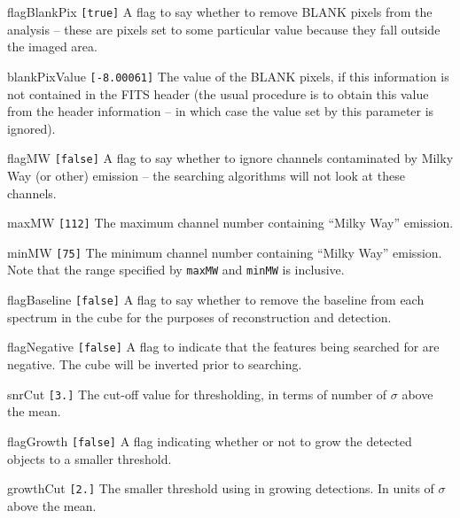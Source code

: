 \begin{entry}
\item[flagBlankPix \texttt{[true]}] A flag to say whether to remove
  BLANK pixels from the analysis -- these are pixels set to some
  particular value because they fall outside the imaged area.
\item[blankPixValue \texttt{[-8.00061]}] The value of the BLANK
  pixels, if this information is not contained in the FITS header (the
  usual procedure is to obtain this value from the header information
  -- in which case the value set by this parameter is ignored).
\item[flagMW \texttt{[false]}] A flag to say whether to ignore
  channels contaminated by Milky Way (or other) emission -- the
  searching algorithms will not look at these channels.
\item[maxMW \texttt{[112]}] The maximum channel number containing
  ``Milky Way'' emission.
\item[minMW \texttt{[75]}] The minimum channel number containing
  ``Milky Way'' emission. Note that the range specified by
  \texttt{maxMW} and \texttt{minMW} is inclusive.
\item[flagBaseline \texttt{[false]}] A flag to say whether to remove
  the baseline from each spectrum in the cube for the purposes of
  reconstruction and detection.
\end{entry}


\begin{entry}
\item[flagNegative \texttt{[false]}] A flag to indicate that the
  features being searched for are negative. The cube will be inverted
  prior to searching.
\item[snrCut \texttt{[3.]}] The cut-off value for thresholding, in
  terms of number of $\sigma$ above the mean.
\item[flagGrowth \texttt{[false]}] A flag indicating whether or not to
  grow the detected objects to a smaller threshold.
\item[growthCut \texttt{[2.]}] The smaller threshold using in growing
  detections. In units of $\sigma$ above the mean.
\end{entry}

